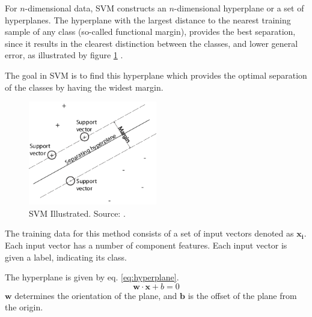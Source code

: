 For \(n\)-dimensional data,
SVM constructs an \(n\)-dimensional hyperplane or a set of hyperplanes.
The hyperplane with the largest distance to the nearest training sample
of any class (so-called functional margin), provides the best separation,
since it results in the clearest distinction between the classes,
and lower general error,
as illustrated by figure \ref{fig::SVM-illustrated} \citep{svmmathworks}.

The goal in SVM is to find this hyperplane which provides the optimal separation 
of the classes by having the widest margin. 

\begin{figure}[ht]
\centering
\includegraphics[width = 0.5\textwidth]{img/svmhyperplane}
\caption[SVM Illustrated]{SVM Illustrated. Source: \citep{svmmathworks}.}
\label{fig::SVM-illustrated}
\end{figure}

The training data for this method consists of a set of input vectors denoted as 
$\mathbf{x_i}$.
Each input vector has a number of component features. Each input 
vector is given a label, indicating its class.

The hyperplane is given by eq. \eqref{eq:hyperplane}.
\begin{equation}
\mathbf{w} \cdot \mathbf{x} + b = 0
\label{eq:hyperplane}
\end{equation}
$\mathbf{w}$ determines the orientation of the plane, and 
$\mathbf{b}$ is the offset of the plane from the origin.
 
